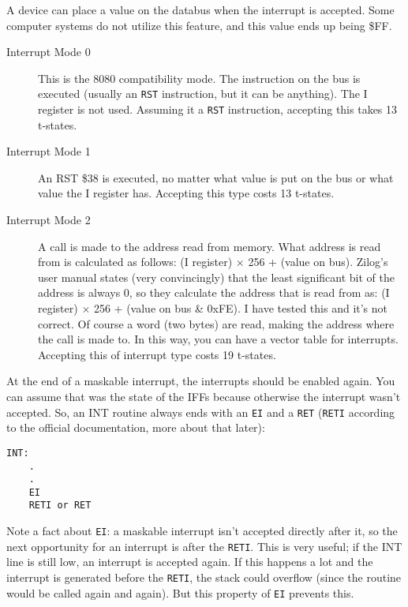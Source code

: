 \documentclass[twoside,openright,a4paper]{book}
\begin{document}
A device can place a value on the databus when the interrupt is accepted. Some computer systems do not utilize this feature, and this value ends up being \$FF.

\begin{description}

	\item[Interrupt Mode 0]
	This is the 8080 compatibility mode. The instruction on the bus is executed (usually an {\tt RST} instruction, but it can be anything). The I register is not used. Assuming it a {\tt RST} instruction, accepting this takes 13 t-states.

	\item[Interrupt Mode 1]
	An RST \$38 is executed, no matter what value is put on the bus or what value the I register has. Accepting this type costs 13 t-states.

	\item[Interrupt Mode 2]
	A call is made to the address read from memory. What address is read from is calculated as follows: (I register) $\times$ 256 + (value on bus). Zilog's user manual states (very convincingly) that the least significant bit of the address is always 0, so they calculate the address that is read from as: (I register) $\times$ 256 + (value on bus \& 0xFE). I have tested this and it's not correct. Of course a word (two bytes) are read, making the address where the call is made to. In this way, you can have a vector table for interrupts. Accepting this of interrupt type costs 19 t-states.

\end{description}

At the end of a maskable interrupt, the interrupts should be enabled again. You can assume that was the state of the IFFs because otherwise the interrupt wasn't accepted. So, an INT routine always ends with an {\tt EI} and a {\tt RET} ({\tt RETI} according to the official documentation, more about that later):

\begin{Verbatim}
INT:
	.
	.
	EI
	RETI or RET
\end{Verbatim}

Note a fact about {\tt EI}: a maskable interrupt isn't accepted directly after it, so the next opportunity for an interrupt is after the {\tt RETI}. This is very useful; if the INT line is still low, an interrupt is accepted again.  If this happens a lot and the interrupt is generated before the {\tt RETI}, the stack could overflow (since the routine would be called again and again). But this property of {\tt EI} prevents this.
\end{document}
